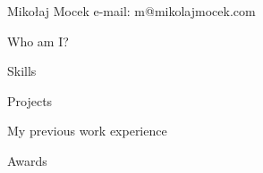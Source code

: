 

Mikołaj Mocek
e-mail: m@mikolajmocek.com

Who am I?

Skills

Projects

My previous work experience

Awards

